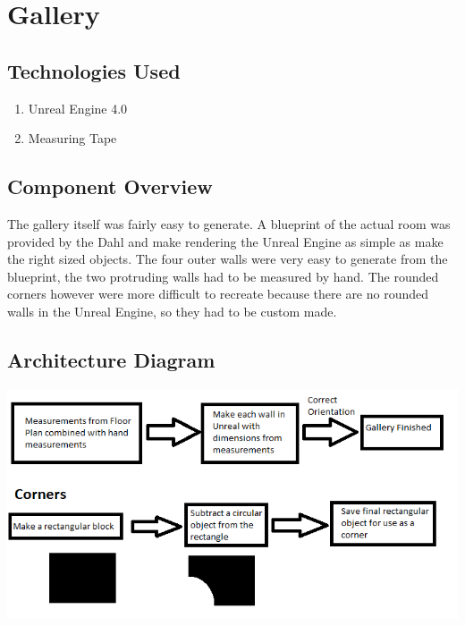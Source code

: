 \section{Gallery }

\subsection{Technologies  Used}
\begin{enumerate}
\item Unreal Engine 4.0
\item Measuring Tape
\end{enumerate}


\subsection{Component  Overview}
The gallery itself was fairly easy to generate.  A blueprint of the actual room was provided by the Dahl and make rendering the Unreal Engine as simple as make the right sized objects.  The four outer walls were very easy to generate from the blueprint, the two protruding walls had to be measured by hand. The rounded corners however were more difficult to recreate because there are no rounded walls in the Unreal Engine, so they had to be custom made.  


\subsection{ Architecture  Diagram}
\includegraphics[scale=1.0]{Diagrams/GalleryDiagram.png}


